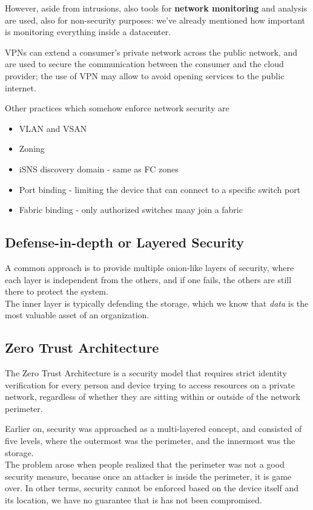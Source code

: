 However, aside from intrusions, also tools for \textbf{network monitoring} and analysis are used, also for non-security purposes: we've already mentioned how important is monitoring everything inside a datacenter.

VPNs can extend a consumer's private network across the public network, and are used to secure the communication between the consumer and the cloud provider; the use of VPN may allow to avoid opening services to the public internet.

Other practices which somehow enforce network security are\ns
\begin{itemize}
   \item VLAN and VSAN
   \item Zoning
   \item iSNS discovery domain - same as FC zones
   \item Port binding - limiting the device that can connect to a specific switch port
   \item Fabric binding - only authorized switches maay join a fabric
\end{itemize}
\subsection{Defense-in-depth or Layered Security}
A common approach is to provide multiple onion-like layers of security, where each layer is independent from the others, and if one fails, the others are still there to protect the system.\\
The inner layer is typically defending the storage, which we know that \textit{data} is the most valuable asset of an organization.

\subsection{Zero Trust Architecture}
The Zero Trust Architecture is a security model that requires strict identity verification for every person and device trying to access resources on a private network, regardless of whether they are sitting within or outside of the network perimeter.

Earlier on, security was approached as a multi-layered concept, and consisted of five levels, where the outermost was the perimeter, and the innermost was the storage.\\
The problem arose when people realized that the perimeter was not a good security measure, because once an attacker is inside the perimeter, it is game over. In other terms, security cannot be enforced based on the device itself and its location, we have no guarantee that is has not been compromised.

